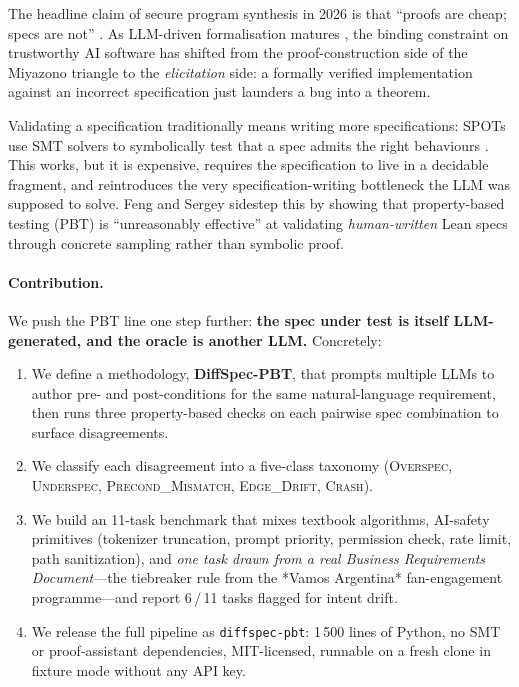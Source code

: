 \documentclass[11pt,a4paper]{article}
\begin{document}
The headline claim of secure program synthesis in 2026 is that ``proofs
are cheap; specs are not'' \cite{dougherty2026tractable}. As LLM-driven
formalisation matures \cite{ma2024autospec,specgen2025}, the binding
constraint on trustworthy AI software has shifted from the
proof-construction side of the Miyazono triangle to the
\emph{elicitation} side: a formally verified implementation against an
incorrect specification just launders a bug into a theorem.

Validating a specification traditionally means writing more
specifications: SPOTs use SMT solvers to symbolically test that a spec
admits the right behaviours \cite{lahiri2026spots}. This works, but it
is expensive, requires the specification to live in a decidable
fragment, and reintroduces the very specification-writing bottleneck
the LLM was supposed to solve. Feng and Sergey
\cite{feng2026pbt} sidestep this by showing that property-based
testing (PBT) is ``unreasonably effective'' at validating
\emph{human-written} Lean specs through concrete sampling rather than
symbolic proof.

\paragraph{Contribution.} We push the PBT line one step further:
\textbf{the spec under test is itself LLM-generated, and the oracle is
another LLM.} Concretely:

\begin{enumerate}[leftmargin=*]
\item We define a methodology, \textbf{DiffSpec-PBT}, that prompts
multiple LLMs to author pre- and post-conditions for the same
natural-language requirement, then runs three property-based checks on
each pairwise spec combination to surface disagreements.
\item We classify each disagreement into a five-class taxonomy
(\textsc{Overspec}, \textsc{Underspec}, \textsc{Precond\_Mismatch},
\textsc{Edge\_Drift}, \textsc{Crash}).
\item We build an 11-task benchmark that mixes textbook algorithms,
AI-safety primitives (tokenizer truncation, prompt priority,
permission check, rate limit, path sanitization), and \emph{one
task drawn from a real Business Requirements Document}—the
tiebreaker rule from the *Vamos Argentina* fan-engagement
programme—and report 6\,/\,11 tasks flagged for intent drift.
\item We release the full pipeline as \texttt{diffspec-pbt}: 1\,500
lines of Python, no SMT or proof-assistant dependencies, MIT-licensed,
runnable on a fresh clone in fixture mode without any API key.
\end{enumerate}
\end{document}
